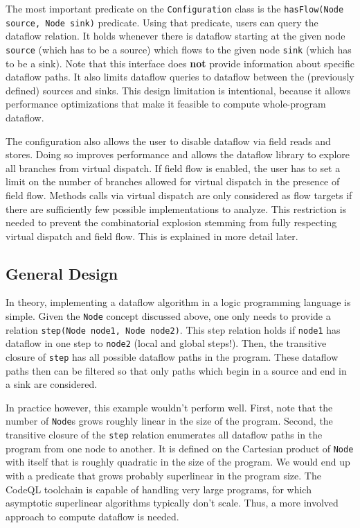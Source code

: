 The most important predicate on the \texttt{Configuration} class 
is the \texttt{hasFlow(Node source, Node sink)} predicate.
Using that predicate, users can query the dataflow relation.
It holds whenever there is dataflow starting at the given node \texttt{source} 
(which has to be a source) which flows to the given node \texttt{sink} (which has to be a sink).
Note that this interface does \textbf{not} provide information about specific
dataflow paths.
It also limits dataflow queries to dataflow between the (previously defined) sources and sinks.
This design limitation is intentional, because it allows performance optimizations
that make it feasible to compute whole-program dataflow.

The configuration also allows the user to disable dataflow via field reads and stores.
Doing so improves performance and allows the dataflow library to explore all branches
from virtual dispatch.
If field flow is enabled, the user has to set a limit on the number of branches 
allowed for virtual dispatch in the presence of field flow.
Methods calls via virtual dispatch are only considered as flow targets if there are 
sufficiently few possible implementations to analyze.
This restriction is needed to prevent the combinatorial explosion stemming from
fully respecting virtual dispatch and field flow.
This is explained in more detail later.

\subsection{General Design}

In theory, implementing a dataflow algorithm in a logic programming language is simple.
Given the \texttt{Node} concept discussed above, one only needs to provide a relation
\texttt{step(Node node1, Node node2)}.
This step relation holds if \texttt{node1} has dataflow in one step to \texttt{node2}
(local and global steps!).
Then, the transitive closure of \texttt{step} has all possible dataflow paths in the program.
These dataflow paths then can be filtered so that only paths which begin in a source and 
end in a sink are considered.

In practice however, this example wouldn't perform well.
First, note that the number of \texttt{Node}s grows roughly linear in the size of
the program.
Second, the transitive closure of the \texttt{step} relation enumerates all dataflow
paths in the program from one node to another.
It is defined on the Cartesian product of \texttt{Node} with itself that is roughly quadratic 
in the size of the program.
We would end up with a predicate that grows probably superlinear in the program size.
The CodeQL toolchain is capable of handling very large programs,
for which asymptotic superlinear algorithms typically don't scale.
Thus, a more involved approach to compute dataflow is needed.

